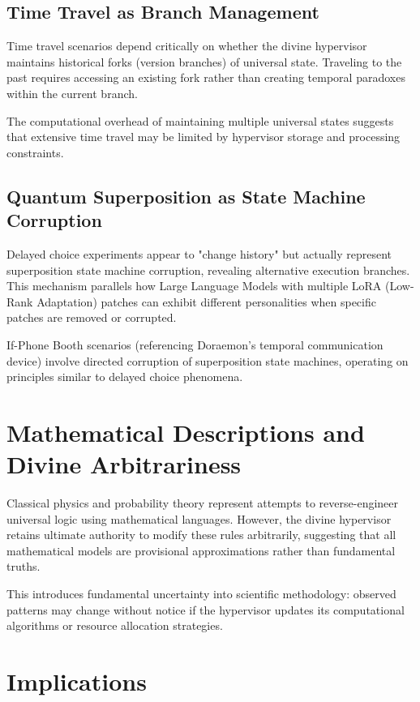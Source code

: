 \documentclass[12pt,a4paper]{article}
\begin{document}
\subsection{Time Travel as Branch Management}

Time travel scenarios depend critically on whether the divine hypervisor maintains historical forks (version branches) of universal state. Traveling to the past requires accessing an existing fork rather than creating temporal paradoxes within the current branch.

The computational overhead of maintaining multiple universal states suggests that extensive time travel may be limited by hypervisor storage and processing constraints.

\subsection{Quantum Superposition as State Machine Corruption}

Delayed choice experiments appear to "change history" but actually represent superposition state machine corruption, revealing alternative execution branches. This mechanism parallels how Large Language Models with multiple LoRA (Low-Rank Adaptation) patches can exhibit different personalities when specific patches are removed or corrupted.

If-Phone Booth scenarios (referencing Doraemon's temporal communication device) involve directed corruption of superposition state machines, operating on principles similar to delayed choice phenomena.

\section{Mathematical Descriptions and Divine Arbitrariness}

Classical physics and probability theory represent attempts to reverse-engineer universal logic using mathematical languages. However, the divine hypervisor retains ultimate authority to modify these rules arbitrarily, suggesting that all mathematical models are provisional approximations rather than fundamental truths.

This introduces fundamental uncertainty into scientific methodology: observed patterns may change without notice if the hypervisor updates its computational algorithms or resource allocation strategies.

\section{Implications}
\end{document}
